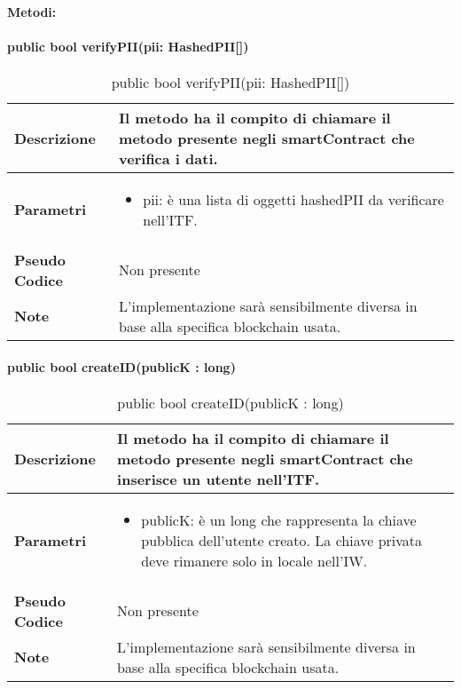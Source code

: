 \paragraph{Metodi:}
\paragraph{public bool verifyPII(pii: HashedPII[])}
\begin{center}
    \begin{longtable}{|p{3cm}|p{9cm}|}%
    \caption{public bool verifyPII(pii: HashedPII[])}
    \label{tab:public-bool-verifyPII}
    \endfirsthead
    \endhead
    \hline
    \textbf{Descrizione} & Il metodo ha il compito di chiamare il metodo presente negli smartContract che verifica i dati. \\
    \hline
    \textbf{Parametri} &      
    \begin{itemize}
        \item pii: è una lista di oggetti hashedPII da verificare nell’ITF.
    \end{itemize} 
    \\
    \hline
    \textbf{Pseudo Codice} & 
    Non presente\\
    \hline
    \textbf{Note} & L’implementazione sarà sensibilmente diversa in base alla specifica blockchain usata. \\
    \hline
    \end{longtable}
    \end{center}

\paragraph{public bool createID(publicK : long)}
\begin{center}
    \begin{longtable}{|p{3cm}|p{9cm}|}%
    \caption{public bool createID(publicK : long)}
    \label{tab:public-bool-createID}
    \endfirsthead
    \endhead
    \hline
    \textbf{Descrizione} & Il metodo ha il compito di chiamare il metodo presente negli smartContract che inserisce un utente nell’ITF. \\
    \hline
    \textbf{Parametri} &      
    \begin{itemize}
        \item publicK: è un long che rappresenta la chiave pubblica dell’utente creato. La chiave privata deve rimanere solo in locale nell’IW.
    \end{itemize} 
    \\
    \hline
    \textbf{Pseudo Codice} & 
    Non presente\\
    \hline
    \textbf{Note} & L’implementazione sarà sensibilmente diversa in base alla specifica blockchain usata. \\
    \hline
    \end{longtable}
    \end{center}

